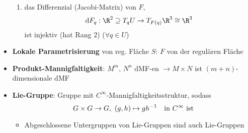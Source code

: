 \begin{itemize}
\begin{enumerate}
    \item das Differenzial (Jacobi-Matrix) von \( F \),
    \begin{equation*}
      \text{d}F_q : \R^2 \supseteq T_q U \to T_{F(q)}\R^3 \cong \R^3
    \end{equation*}
    ist injektiv (hat Rang \( 2 \)) (\( \forall q \in U \))
  \end{enumerate}
  \item \textbf{Lokale Parametrisierung} von reg. Fläche \( S \): \( F \) von der regulären Fläche
  \item \textbf{Produkt-Mannigfaltigkeit}: \( M^m \), \( N^n \) dMF-en \( \to M \times N \) ist \( (m+n) \)-dimensionale dMF
  \item \textbf{Lie-Gruppe}: Gruppe mit \( C^\infty \)-Mannigfaltigkeitsstruktur, sodass
  \begin{equation*}
    G \times G \to G\text{,} \enskip (g,h) \mapsto gh^{-1} \quad \text{in \( C^\infty \) ist}
  \end{equation*}
  \begin{itemize}
    \item Abgeschlossene Untergruppen von Lie-Gruppen sind auch Lie-Gruppen
  \end{itemize}
\end{itemize}

